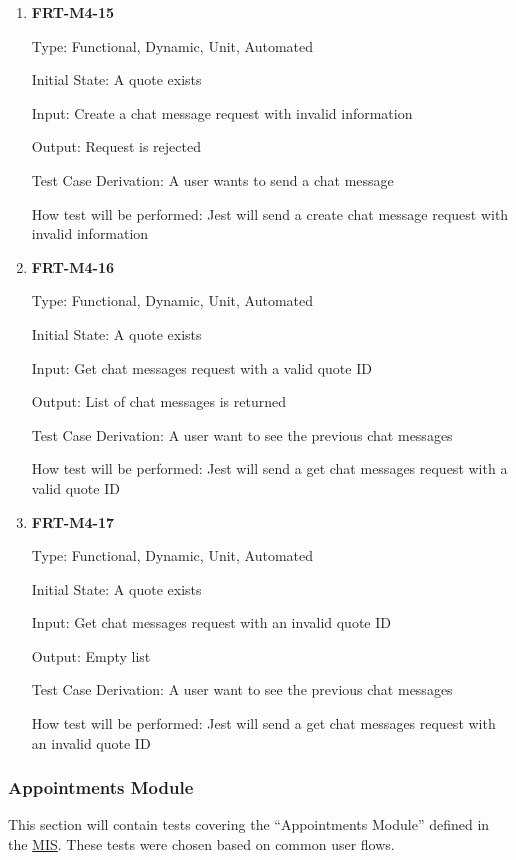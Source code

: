 \documentclass[12pt, titlepage]{article}
\begin{document}
\begin{enumerate}
	\item \textbf{FRT-M4-15}

	      Type: Functional, Dynamic, Unit, Automated

	      Initial State: A quote exists

	      Input: Create a chat message request with invalid information

	      Output: Request is rejected

	      Test Case Derivation: A user wants to send a chat message

	      How test will be performed: Jest will send a create chat message request with invalid information

	\item \textbf{FRT-M4-16}

	      Type: Functional, Dynamic, Unit, Automated

	      Initial State: A quote exists

	      Input: Get chat messages request with a valid quote ID

	      Output: List of chat messages is returned

	      Test Case Derivation: A user want to see the previous chat messages

	      How test will be performed: Jest will send a get chat messages request with a valid quote ID

	\item \textbf{FRT-M4-17}

	      Type: Functional, Dynamic, Unit, Automated

	      Initial State: A quote exists

	      Input: Get chat messages request with an invalid quote ID

	      Output: Empty list

	      Test Case Derivation: A user want to see the previous chat messages

	      How test will be performed: Jest will send a get chat messages request with an invalid quote ID

\end{enumerate}

\subsubsection{Appointments Module}

This section will contain tests covering the ``Appointments Module'' defined in the
\href{https://github.com/arkinmodi/project-sayyara/blob/main/docs/Design/MIS/MIS.pdf}{MIS}. These
tests were chosen based on common user flows.
\end{document}
